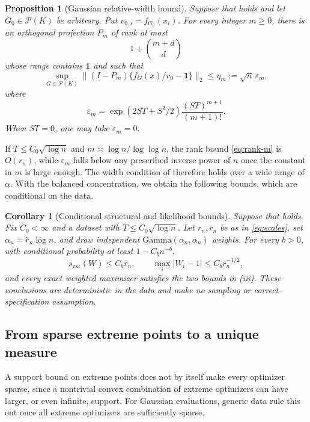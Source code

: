\documentclass[11pt]{article}
\newtheorem{proposition}{Proposition}
\newtheorem{corollary}{Corollary}
\theoremstyle{definition}
\theoremstyle{remark}
\newcommand{\Pcal}{\mathcal P}
\newcommand{\one}{\bm 1}
\newcommand{\norm}[1]{\lVert #1\rVert}
\newcommand{\abs}[1]{\lvert #1\rvert}
\newcommand{\eps}{\varepsilon}
\newcommand{\sext}{s_{\mathrm{ext}}}
\begin{document}
\begin{proposition}[Gaussian relative-width bound]
\label{prop:gaussian-width}
Suppose that  holds and let $G_0\in\Pcal(K)$ be
arbitrary.  Put
$v_{0,i}=f_{G_0}(x_i)$.  For every integer $m\ge0$, there is an orthogonal
projection $P_m$ of rank at most
\begin{equation}\label{eq:rank-m}
 1+\binom{m+d}{d}
\end{equation}
whose range contains $\one$ and such that
\begin{equation}\label{eq:eta-m}
 \sup_{G\in\Pcal(K)}
 \norm{(I-P_m)\{f_G(x)/v_0-\one\}}_2
 \le \eta_m:=\sqrt n\,\eps_m,
\end{equation}
where
\begin{equation}\label{eq:eps-m}
 \eps_m=\exp(2ST+S^2/2)\frac{(ST)^{m+1}}{(m+1)!}.
\end{equation}
When $ST=0$, one may take $\eps_m=0$.
\end{proposition}

If $T\le C_0\sqrt{\log n}$ and $m\asymp\log n/\log\log n$, the rank bound
\eqref{eq:rank-m} is $O(r_n)$, while $\eps_m$ falls below any prescribed
inverse power of $n$ once the constant in $m$ is large enough.  The width
condition of  therefore holds over a wide range of
$\alpha$.  With the balanced concentration, we obtain the following bounds,
which are conditional on the data.

\begin{corollary}[Conditional structural and likelihood bounds]
\label{cor:conditional}
Suppose that  holds.  Fix $C_0<\infty$ and a dataset
with $T\le C_0\sqrt{\log n}$.  Let $r_n,\bar r_n$ be as in
\eqref{eq:scales}, set $\alpha_n=\bar r_n\log n$, and draw independent
$\mathrm{Gamma}(\alpha_n,\alpha_n)$ weights.  For every $b>0$, with
conditional probability at least $1-C_bn^{-b}$,
\[
 \sext(W)\le C_b\bar r_n,
 \qquad
 \max_i\abs{W_i-1}\le C_b\bar r_n^{-1/2},
\]
and every exact weighted maximizer satisfies the two bounds in
(iii).  These conclusions are deterministic in the data and
make no sampling or correct-specification assumption.
\end{corollary}

\subsection{From sparse extreme points to a unique measure}

A support bound on extreme points does not by itself make every optimizer
sparse, since a nontrivial convex combination of extreme optimizers can have
larger, or even infinite, support.  For Gaussian evaluations, generic data
rule this out once all extreme optimizers are sufficiently sparse.
\end{document}
